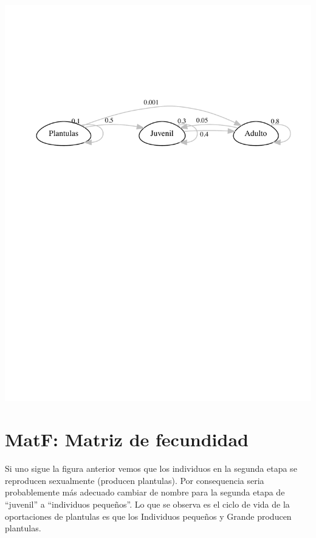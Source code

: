 \documentclass[
]{book}
\theoremstyle{definition}
\theoremstyle{definition}
\theoremstyle{definition}
\theoremstyle{definition}
\theoremstyle{remark}
\begin{document}
\includegraphics{Diagnostico_Poblacional_files/figure-latex/chap6_1-1.pdf}

\section{MatF: Matriz de fecundidad}\label{matf-matriz-de-fecundidad}

Si uno sigue la figura anterior vemos que los individuos en la segunda etapa se reproducen sexualmente (producen plantulas). Por consequencia seria probablemente más adecuado cambiar de nombre para la segunda etapa de ``juvenil'' a ``individuos pequeños''. Lo que se observa es el ciclo de vida de la oportaciones de plantulas es que los Individuos pequeños y Grande producen plantulas.
\end{document}
